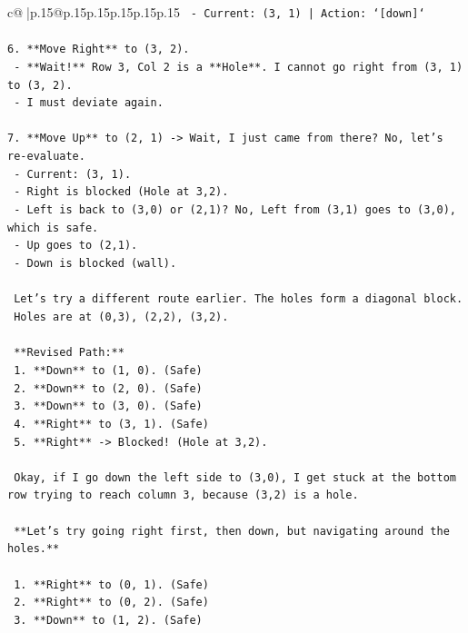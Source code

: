 \documentclass{article}
\begin{document}
{\begin{supertabular}{c@{$\;$}|p{.15\linewidth}@{}p{.15\linewidth}p{.15\linewidth}p{.15\linewidth}p{.15\linewidth}p{.15\linewidth}}
{{{\texttt{   {-} Current: (3, 1) | Action: `{[}down{]}`} \\
\\ 
\texttt{6. **Move Right** to (3, 2).} \\
\texttt{   {-} **Wait!** Row 3, Col 2 is a **Hole**. I cannot go right from (3, 1) to (3, 2).} \\
\texttt{   {-} I must deviate again.} \\
\\ 
\texttt{7. **Move Up** to (2, 1) {-}> Wait, I just came from there? No, let's re{-}evaluate.} \\
\texttt{   {-} Current: (3, 1).} \\
\texttt{   {-} Right is blocked (Hole at 3,2).} \\
\texttt{   {-} Left is back to (3,0) or (2,1)? No, Left from (3,1) goes to (3,0), which is safe.} \\
\texttt{   {-} Up goes to (2,1).} \\
\texttt{   {-} Down is blocked (wall).} \\
\\ 
\texttt{   Let's try a different route earlier. The holes form a diagonal block.} \\
\texttt{   Holes are at (0,3), (2,2), (3,2).} \\
\\ 
\texttt{   **Revised Path:**} \\
\texttt{   1. **Down** to (1, 0). (Safe)} \\
\texttt{   2. **Down** to (2, 0). (Safe)} \\
\texttt{   3. **Down** to (3, 0). (Safe)} \\
\texttt{   4. **Right** to (3, 1). (Safe)} \\
\texttt{   5. **Right** {-}> Blocked! (Hole at 3,2).} \\
\\ 
\texttt{   Okay, if I go down the left side to (3,0), I get stuck at the bottom row trying to reach column 3, because (3,2) is a hole.} \\
\\ 
\texttt{   **Let's try going right first, then down, but navigating around the holes.**} \\
\\ 
\texttt{   1. **Right** to (0, 1). (Safe)} \\
\texttt{   2. **Right** to (0, 2). (Safe)} \\
\texttt{   3. **Down** to (1, 2). (Safe)} \\
}}}
\end{supertabular}}
\end{document}
